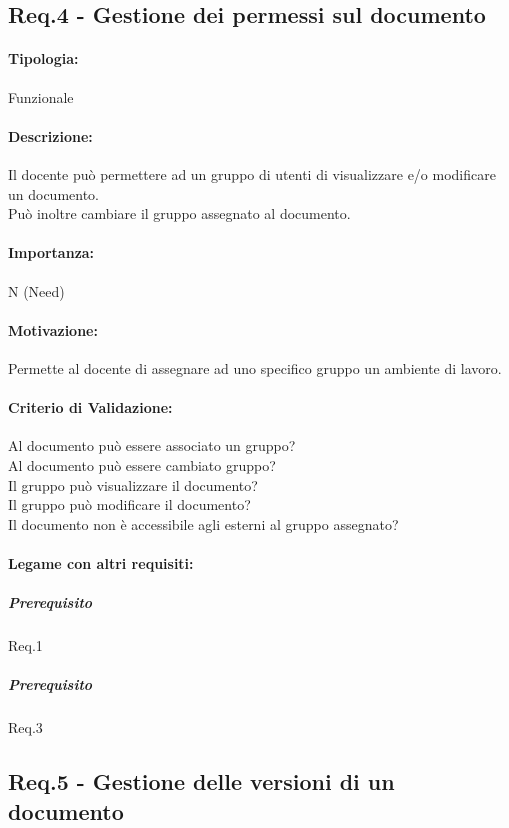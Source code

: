 \subsection{Req.4 - Gestione dei permessi sul documento}
\paragraph{Tipologia:}
	Funzionale
\paragraph{Descrizione:}
	Il docente può permettere ad un gruppo di utenti di visualizzare e/o modificare un documento.\\
	Può inoltre cambiare il gruppo assegnato al documento.
\paragraph{Importanza:}
	N (Need)
\paragraph{Motivazione:}
	Permette al docente di assegnare ad uno specifico gruppo un ambiente di lavoro.
\paragraph{Criterio di Validazione:}
	Al documento può essere associato un gruppo?\\
	Al documento può essere cambiato gruppo?\\
	Il gruppo può visualizzare il documento?\\
	Il gruppo può modificare il documento?\\
	Il documento non è accessibile agli esterni al gruppo assegnato?
\paragraph{Legame con altri requisiti:}
	\subparagraph{Prerequisito} Req.1
	\subparagraph{Prerequisito} Req.3




\subsection{Req.5 - Gestione delle versioni di un documento}
